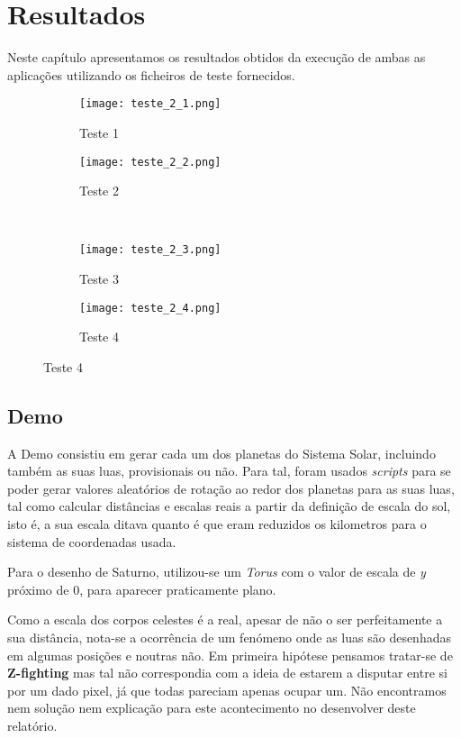 \documentclass[14pt, a4 paper]{report}
\begin{document}
\chapter{Resultados} \label{chap:resultado}

Neste capítulo apresentamos os resultados obtidos da execução de ambas as aplicações utilizando os ficheiros de teste fornecidos.

\begin{figure}[h]
    \centering
    \begin{subfigure}{.5\textwidth}
    \centering
    \texttt{[image: teste\_2\_1.png]}
    \caption{Teste 1}
    \label{fig:sub1}
    \end{subfigure}%
    \begin{subfigure}{.5\textwidth}
    \centering
    \texttt{[image: teste\_2\_2.png]}
    \caption{Teste 2}
    \label{fig:sub2}
    \end{subfigure}%
    \\
    \begin{subfigure}{.5\textwidth}
    \centering
    \texttt{[image: teste\_2\_3.png]}
    \caption{Teste 3}
    \label{fig:sub3}
    \end{subfigure}%
    \begin{subfigure}{.5\textwidth}
    \centering
    \texttt{[image: teste\_2\_4.png]}
    \caption{Teste 4}
    \label{fig:sub4}
    \end{subfigure}%
    \label{fig:2}
\end{figure}

\section{Demo}

A Demo consistiu em gerar cada um dos planetas do Sistema Solar, incluindo também as suas luas, provisionais ou não. Para tal, foram usados \textit{scripts} para se poder gerar valores aleatórios de rotação ao redor dos planetas para as suas luas, tal como calcular distâncias e escalas reais a partir da definição de escala do sol, isto é, a sua escala ditava quanto é que eram reduzidos os kilometros para o sistema de coordenadas usada.

Para o desenho de Saturno, utilizou-se um \textit{Torus} com o valor de escala de \textit{y} próximo de 0, para aparecer praticamente plano.

Como a escala dos corpos celestes é a real, apesar de não o ser perfeitamente a sua distância, nota-se a ocorrência de um fenómeno onde as luas são desenhadas em algumas posições e noutras não. Em primeira hipótese pensamos tratar-se de \textbf{Z-fighting} mas tal não correspondia com a ideia de estarem a disputar entre si por um dado pixel, já que todas pareciam apenas ocupar um. Não encontramos nem solução nem explicação para este acontecimento no desenvolver deste relatório.
\end{document}
